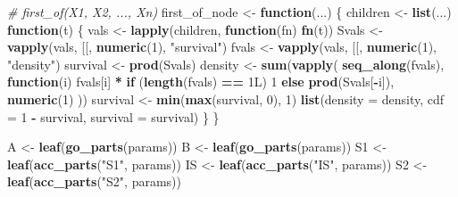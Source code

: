 \documentclass[
]{article}
\newenvironment{Shaded}{\begin{snugshade}}{\end{snugshade}}
\newcommand{\AttributeTok}[1]{\textcolor[rgb]{0.13,0.29,0.53}{#1}}
\newcommand{\CommentTok}[1]{\textcolor[rgb]{0.56,0.35,0.01}{\textit{#1}}}
\newcommand{\ControlFlowTok}[1]{\textcolor[rgb]{0.13,0.29,0.53}{\textbf{#1}}}
\newcommand{\DataTypeTok}[1]{\textcolor[rgb]{0.13,0.29,0.53}{#1}}
\newcommand{\DecValTok}[1]{\textcolor[rgb]{0.00,0.00,0.81}{#1}}
\newcommand{\FunctionTok}[1]{\textcolor[rgb]{0.13,0.29,0.53}{\textbf{#1}}}
\newcommand{\NormalTok}[1]{#1}
\newcommand{\OtherTok}[1]{\textcolor[rgb]{0.56,0.35,0.01}{#1}}
\newcommand{\SpecialCharTok}[1]{\textcolor[rgb]{0.81,0.36,0.00}{\textbf{#1}}}
\newcommand{\StringTok}[1]{\textcolor[rgb]{0.31,0.60,0.02}{#1}}
\begin{document}
\begin{Shaded}
\begin{Highlighting}[]
\CommentTok{\# first\_of(X1, X2, ..., Xn)}
\NormalTok{first\_of\_node }\OtherTok{\textless{}{-}} \ControlFlowTok{function}\NormalTok{(...) \{}
\NormalTok{  children }\OtherTok{\textless{}{-}} \FunctionTok{list}\NormalTok{(...)}
  \ControlFlowTok{function}\NormalTok{(t) \{}
\NormalTok{    vals }\OtherTok{\textless{}{-}} \FunctionTok{lapply}\NormalTok{(children, }\ControlFlowTok{function}\NormalTok{(fn) }\FunctionTok{fn}\NormalTok{(t))}
\NormalTok{    Svals }\OtherTok{\textless{}{-}} \FunctionTok{vapply}\NormalTok{(vals, }\StringTok{\textasciigrave{}}\AttributeTok{[[}\StringTok{\textasciigrave{}}\NormalTok{, }\FunctionTok{numeric}\NormalTok{(}\DecValTok{1}\NormalTok{), }\StringTok{"survival"}\NormalTok{)}
\NormalTok{    fvals }\OtherTok{\textless{}{-}} \FunctionTok{vapply}\NormalTok{(vals, }\StringTok{\textasciigrave{}}\AttributeTok{[[}\StringTok{\textasciigrave{}}\NormalTok{, }\FunctionTok{numeric}\NormalTok{(}\DecValTok{1}\NormalTok{), }\StringTok{"density"}\NormalTok{)}
\NormalTok{    survival }\OtherTok{\textless{}{-}} \FunctionTok{prod}\NormalTok{(Svals)}
\NormalTok{    density }\OtherTok{\textless{}{-}} \FunctionTok{sum}\NormalTok{(}\FunctionTok{vapply}\NormalTok{(}
      \FunctionTok{seq\_along}\NormalTok{(fvals),}
      \ControlFlowTok{function}\NormalTok{(i) fvals[i] }\SpecialCharTok{*} \ControlFlowTok{if}\NormalTok{ (}\FunctionTok{length}\NormalTok{(fvals) }\SpecialCharTok{==} \DecValTok{1}\DataTypeTok{L}\NormalTok{) }\DecValTok{1} \ControlFlowTok{else} \FunctionTok{prod}\NormalTok{(Svals[}\SpecialCharTok{{-}}\NormalTok{i]),}
      \FunctionTok{numeric}\NormalTok{(}\DecValTok{1}\NormalTok{)}
\NormalTok{    ))}
\NormalTok{    survival }\OtherTok{\textless{}{-}} \FunctionTok{min}\NormalTok{(}\FunctionTok{max}\NormalTok{(survival, }\DecValTok{0}\NormalTok{), }\DecValTok{1}\NormalTok{)}
    \FunctionTok{list}\NormalTok{(}\AttributeTok{density =}\NormalTok{ density, }\AttributeTok{cdf =} \DecValTok{1} \SpecialCharTok{{-}}\NormalTok{ survival, }\AttributeTok{survival =}\NormalTok{ survival)}
\NormalTok{  \}}
\NormalTok{\}}

\NormalTok{A  }\OtherTok{\textless{}{-}} \FunctionTok{leaf}\NormalTok{(}\FunctionTok{go\_parts}\NormalTok{(params))}
\NormalTok{B  }\OtherTok{\textless{}{-}} \FunctionTok{leaf}\NormalTok{(}\FunctionTok{go\_parts}\NormalTok{(params))}
\NormalTok{S1 }\OtherTok{\textless{}{-}} \FunctionTok{leaf}\NormalTok{(}\FunctionTok{acc\_parts}\NormalTok{(}\StringTok{"S1"}\NormalTok{, params))}
\NormalTok{IS }\OtherTok{\textless{}{-}} \FunctionTok{leaf}\NormalTok{(}\FunctionTok{acc\_parts}\NormalTok{(}\StringTok{"IS"}\NormalTok{, params))}
\NormalTok{S2 }\OtherTok{\textless{}{-}} \FunctionTok{leaf}\NormalTok{(}\FunctionTok{acc\_parts}\NormalTok{(}\StringTok{"S2"}\NormalTok{, params))}


\end{Highlighting}
\end{Shaded}
\end{document}
